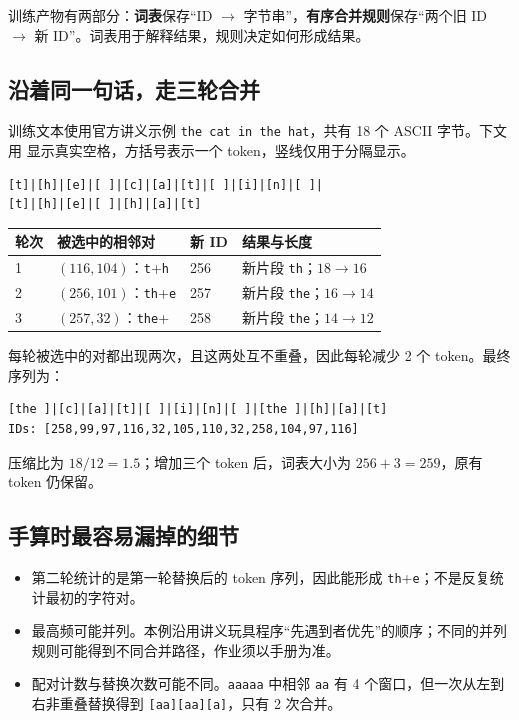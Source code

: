 \documentclass[UTF8,fontset=fandol,zihao=-4,a4paper]{ctexart}
\newcommand{\tok}[1]{\texttt{#1}}
\newcommand{\spacechar}{\textvisiblespace}
\begin{document}
训练产物有两部分：\textbf{词表}保存“ID $\rightarrow$ 字节串”，\textbf{有序合并规则}保存“两个旧 ID $\rightarrow$ 新 ID”。词表用于解释结果，规则决定如何形成结果。

\subsection{沿着同一句话，走三轮合并}
训练文本使用官方讲义示例 \tok{the cat in the hat}，共有 18 个 ASCII 字节。下文用 \spacechar{} 显示真实空格，方括号表示一个 token，竖线仅用于分隔显示。
\begin{lstlisting}
[t]|[h]|[e]|[ ]|[c]|[a]|[t]|[ ]|[i]|[n]|[ ]|
[t]|[h]|[e]|[ ]|[h]|[a]|[t]
\end{lstlisting}
\par\noindent\begin{tabularx}{\linewidth}{@{}P{10mm}P{46mm}P{15mm}Y@{}}
\toprule
轮次 & 被选中的相邻对 & 新 ID & 结果与长度\\
 & $(116,104)$：\tok{t}+\tok{h} & 256 & 新片段 \tok{th}；$18\rightarrow16$\\
2 & $(256,101)$：\tok{th}+\tok{e} & 257 & 新片段 \tok{the}；$16\rightarrow14$\\
3 & $(257,32)$：\tok{the}+\spacechar & 258 & 新片段 \tok{the}\spacechar；$14\rightarrow12$\\
\bottomrule
\end{tabularx}

每轮被选中的对都出现两次，且这两处互不重叠，因此每轮减少 2 个 token。最终序列为：
\begin{lstlisting}
[the ]|[c]|[a]|[t]|[ ]|[i]|[n]|[ ]|[the ]|[h]|[a]|[t]
IDs: [258,99,97,116,32,105,110,32,258,104,97,116]
\end{lstlisting}
压缩比为 $18/12=1.5$；增加三个 token 后，词表大小为 $256+3=259$，原有 token 仍保留。

\subsection{手算时最容易漏掉的细节}
\begin{itemize}
\item 第二轮统计的是第一轮替换后的 token 序列，因此能形成 \tok{th}+\tok{e}；不是反复统计最初的字符对。
\item 最高频可能并列。本例沿用讲义玩具程序“先遇到者优先”的顺序；不同的并列规则可能得到不同合并路径，作业须以手册为准。
\item 配对计数与替换次数可能不同。\tok{aaaaa} 中相邻 \tok{aa} 有 4 个窗口，但一次从左到右非重叠替换得到 \tok{[aa][aa][a]}，只有 2 次合并。
\end{itemize}
\end{document}
